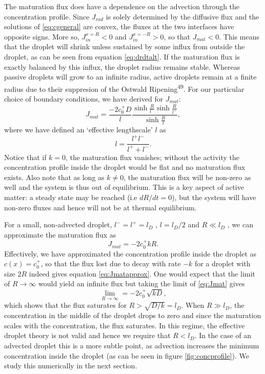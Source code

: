\documentclass{Dissertate}
\begin{document}
The maturation flux does have a dependence on the advection through the concentration profile. Since \(J_{rad}\) is solely
determined by the diffusive flux and the solutions of
\ref{eq:cgeneral} are convex, the fluxes at the two interfaces have
opposite signs. More so, \(J_{in}^{x=R}<0\) and \(J_{in}^{x=-R}>0\), so
that \(J_{mat}<0\). This means that the droplet will shrink unless
sustained by some influx from outside the droplet, as can be seen from
equation \ref{eq:drdtalt}. If the maturation flux is exactly
balanced by this influx, the droplet radius remains stable. Whereas
passive droplets will grow to an infinite radius, active droplets remain
at a finite radius due to their suppresion of the Ostwald
Ripening\textsuperscript{49}. For our particular choice of boundary
conditions, we have derived for \(J_{mat}\): \begin{equation}
J_{mat} = \frac{-2c_0^+D}{l}\frac{\sinh\frac{R}{l^-}\sinh\frac{R}{l^+}}{\sinh\frac{R}{l}},
\label{eq:Jmat}\end{equation} where we have defined an `effective
lengthscale' \(l\) as \[
l = \frac{l^+l^-}{l^++l^-}.
\] 
Notice that if $k=0$, the maturation flux vanishes; without the activity the concentration profile inside the droplet would be flat and no maturation flux exists. Also note that as long as $k\neq 0$, the maturation flux will be non-zero as well and the system is thus out of equilibrium. This is a key aspect of active matter: a steady state may be reached (i.e $dR/dt=0$), but the system will have non-zero fluxes and hence will not be at thermal equilibrium.

For a small, non-advected droplet, \(l^-=l^+=l_D\) , \(l=l_D/2\) and
\(R\ll l_D\) , we can approximate the maturation flux as
\begin{equation}
J_{mat}=-2c_0^+kR.
\label{eq:Jmatapprox}\end{equation} Effectively, we have approximated
the concentration profile inside the droplet as \(c(x)=c_0^+\), so that
the flux lost due to decay with rate \(-k\) for a droplet with size
\(2R\) indeed gives equation \ref{eq:Jmatapprox}. One would expect that the limit of \(R\to \infty\) would yield an infinite flux
but taking the limit of \ref{eq:Jmat} gives \[
\lim_{R\to\infty} = -2c_0^+\sqrt{kD},
\] 
which shows that the flux saturates for
\(R>\sqrt{D/k}=l_D\). When \(R\gg l_D\), the concentration in the middle
of the droplet drops to zero and since the maturation scales with the
concentration, the flux saturates. In this regime, the effective droplet
theory is not valid and hence we require that \(R<l_D\). In the case of
an advected droplet this is a more subtle point, as advection increases
the minimum concentration inside the droplet (as can be seen in figure
\ref{fig:concprofile}). We study this numerically in the next
section.
\end{document}
